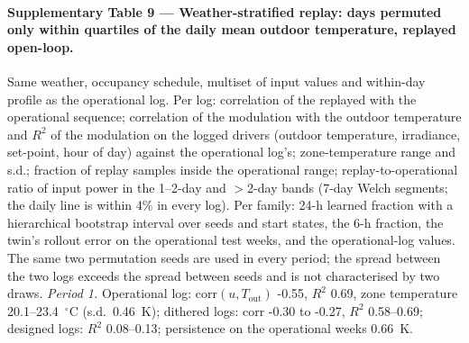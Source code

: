 \documentclass[11pt]{article}
\begin{document}
\paragraph{Supplementary Table 9 --- Weather-stratified replay: days permuted only within quartiles of the daily mean outdoor temperature, replayed open-loop.} Same weather, occupancy schedule, multiset of input values and within-day profile as the operational log. Per log: correlation of the replayed with the operational sequence; correlation of the modulation with the outdoor temperature and $R^2$ of the modulation on the logged drivers (outdoor temperature, irradiance, set-point, hour of day) against the operational log's; zone-temperature range and s.d.; fraction of replay samples inside the operational range; replay-to-operational ratio of input power in the 1--2-day and $>$2-day bands (7-day Welch segments; the daily line is within 4\% in every log). Per family: 24-h learned fraction with a hierarchical bootstrap interval over seeds and start states, the 6-h fraction, the twin's rollout error on the operational test weeks, and the operational-log values. The same two permutation seeds are used in every period; the spread between the two logs exceeds the spread between seeds and is not characterised by two draws.
\emph{Period 1.} Operational log: corr$(u,T_{\mathrm{out}})$ -0.55, $R^2$ 0.69, zone temperature 20.1--23.4~$^\circ$C (s.d.\ 0.46~K); dithered logs: corr -0.30 to -0.27, $R^2$ 0.58--0.69; designed logs: $R^2$ 0.08--0.13; persistence on the operational weeks 0.66~K.
\begin{center}\scriptsize{}\end{center}
\end{document}
